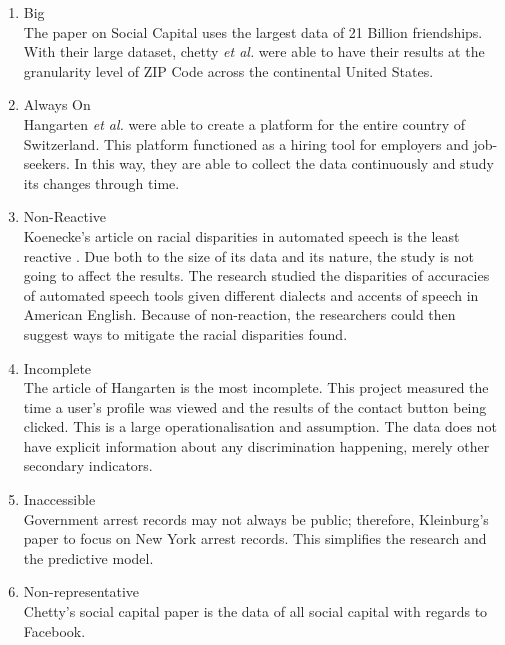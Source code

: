 \documentclass[../ass.tex]{subfiles}
\begin{document}
\begin{enumerate}
    \item Big \\
        The paper on Social Capital \cite{social_cap} uses the largest data of 21 Billion friendships.
        With their large dataset, chetty \textit{et al.} were able to have their results at the granularity level of ZIP Code across the continental United States. 
    \item Always On \\
        Hangarten \textit{et al.} \cite{hiring_disc} were able to create a platform for the entire country of Switzerland. 
        This platform functioned as a hiring tool for employers and job-seekers. 
        In this way, they are able to collect the data continuously and study its changes through time.
    \item Non-Reactive \\
        Koenecke's article on racial disparities in automated speech is the least reactive \cite{racial_speech}.
        Due both to the size of its data and its nature, the study is not going to affect the results. 
        The research studied the disparities of accuracies of automated speech tools given different dialects and accents of speech in American English. 
        Because of non-reaction, the researchers could then suggest ways to mitigate the racial disparities found. 
    \item Incomplete \\
        The article of Hangarten \cite{hiring_disc} is the most incomplete. 
        This project measured the time a user's profile was viewed and the results of the contact button being clicked. 
        This is a large operationalisation and assumption. 
        The data does not have explicit information about any discrimination happening, merely other secondary indicators.
    \item Inaccessible \\
        Government arrest records may not always be public; therefore, Kleinburg's paper \cite{machine_pred} to focus on New York arrest records. 
        This simplifies the research and the predictive model.
    \item Non-representative \\
        Chetty's social capital paper \cite{social_cap} is the data of all social capital with regards to Facebook. 

\end{enumerate}
\end{document}
